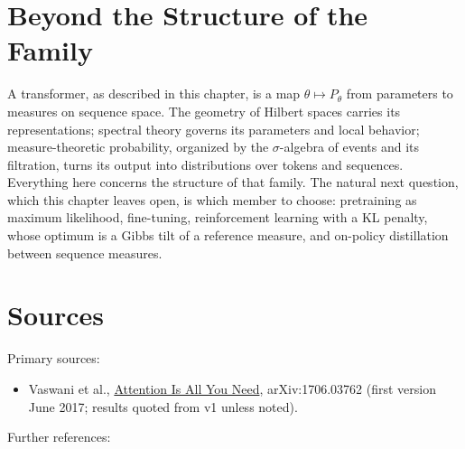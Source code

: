 \section{Beyond the Structure of the Family}

A transformer, as described in this chapter, is a map \(\theta \mapsto P_\theta\) from
parameters to measures on sequence space. The geometry of Hilbert spaces
carries its representations; spectral theory governs its parameters and
local behavior; measure-theoretic probability, organized by the
\(\sigma\)-algebra of events and its filtration, turns its output into
distributions over tokens and sequences. Everything here concerns the
structure of that family. The natural next question, which this chapter
leaves open, is which member to choose:
pretraining as maximum likelihood, fine-tuning, reinforcement learning
with a KL penalty, whose optimum is a Gibbs tilt of a reference measure,
and on-policy distillation between sequence measures.

\section{Sources}

Primary sources:

\begin{itemize}
\tightlist
\item
  Vaswani et al., \href{https://arxiv.org/abs/1706.03762}{Attention Is
  All You Need}, arXiv:1706.03762 (first version June 2017; results
  quoted from v1 unless noted).
\end{itemize}

Further references:


